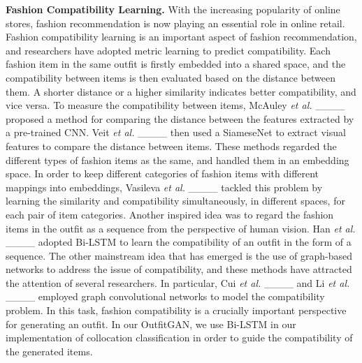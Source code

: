 \textbf{Fashion Compatibility Learning.} With the increasing popularity of online stores, fashion recommendation is now playing an essential role in online retail. Fashion compatibility learning is an important aspect of fashion recommendation, and researchers have adopted metric learning to predict compatibility. Each fashion item in the same outfit is firstly embedded into a shared space, and the compatibility between items is then evaluated based on the distance between them. A shorter distance or a higher similarity indicates better compatibility, and vice versa. To measure the compatibility between items, McAuley \textit{et al.} ____ proposed a method for comparing the distance between the features extracted by a pre-trained CNN. Veit \textit{et al.} ____ then used a SiameseNet to extract visual features to compare the distance between items. These methods regarded the different types of fashion items as the same, and handled them in an embedding space. In order to keep different categories of fashion items with different mappings into embeddings, Vasileva \textit{et al.} ____ tackled this problem by learning the similarity and compatibility simultaneously, in different spaces, for each pair of item categories. Another inspired idea was to regard the fashion items in the outfit as a sequence from the perspective of human vision. Han \textit{et al.} ____ adopted Bi-LSTM to learn the compatibility of an outfit in the form of a sequence. The other mainstream idea that has emerged is the use of graph-based networks to address the issue of compatibility, and these methods have attracted the attention of several researchers. In particular, Cui \textit{et al.} ____ and Li \textit{et al.} ____ employed graph convolutional networks to model the compatibility problem. In this task, fashion compatibility is a crucially important perspective for generating an outfit. In our OutfitGAN, we use Bi-LSTM in our implementation of collocation classification in order to guide the compatibility of the generated items. 

